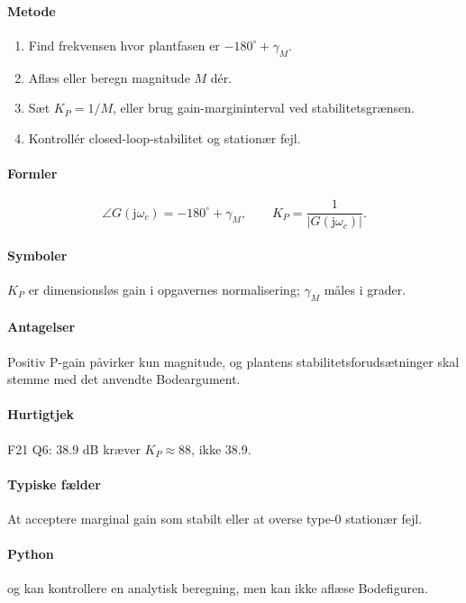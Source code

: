 \paragraph{Metode}
\begin{enumerate}
\item Find frekvensen hvor plantfasen er \(-180^\circ+\gamma_M\).
\item Aflæs eller beregn magnitude \(M\) dér.
\item Sæt \(K_P=1/M\), eller brug gain-margininterval ved stabilitetsgrænsen.
\item Kontrollér closed-loop-stabilitet og stationær fejl.
\end{enumerate}

\paragraph{Formler}
\[
\angle G(\mathrm{j}\omega_c)=-180^\circ+\gamma_M,\qquad
K_P=\frac1{|G(\mathrm{j}\omega_c)|}.
\]

\paragraph{Symboler}
\(K_P\) er dimensionsløs gain i opgavernes normalisering; \(\gamma_M\) måles i grader.

\paragraph{Antagelser}
Positiv P-gain påvirker kun magnitude, og plantens stabilitetsforudsætninger skal
stemme med det anvendte Bodeargument.

\paragraph{Hurtigtjek}
F21 Q6: \(38.9\) dB kræver \(K_P\approx88\), ikke 38.9.

\paragraph{Typiske fælder}
At acceptere marginal gain som stabilt eller at overse type-0 stationær fejl.

\paragraph{Python}
 og  kan kontrollere
en analytisk beregning, men kan ikke aflæse Bodefiguren.
